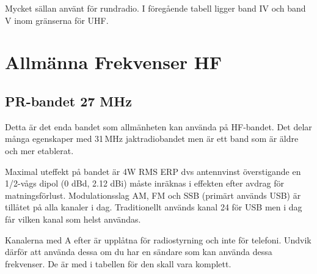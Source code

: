 Mycket sällan använt för rundradio.
I föregående tabell ligger band IV och band V inom gränserna för UHF.

\section{Allmänna Frekvenser HF}

\subsection{PR-bandet 27 MHz}

Detta är det enda bandet som allmänheten kan använda på HF-bandet. Det delar
många egenskaper med 31\,MHz jaktradiobandet men är ett band som är äldre och
mer etablerat.

Maximal uteffekt på bandet är 4W RMS ERP dvs antennvinst överstigande en
1/2-vågs dipol (0 dBd, 2.12 dBi) måste inräknas i effekten efter avdrag för
matningsförlust. Modulationsslag AM, FM och SSB (primärt används USB) är
tillåtet på alla kanaler i dag. Traditionellt används kanal 24 för USB men i
dag får vilken kanal som helst användas.

Kanalerna med A efter är upplåtna för radiostyrning och inte för telefoni.
Undvik därför att använda dessa om du har en sändare som kan använda dessa
frekvenser. De är med i tabellen för den skall vara komplett.

